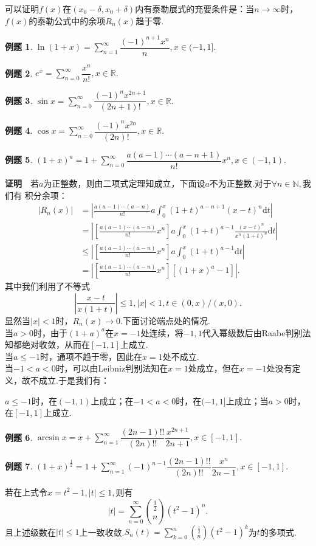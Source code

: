 \documentclass[UTF8]{article}
\newcommand{\R}{\mathbb{R}}
\newcommand{\zm}{\textbf{证明}$\quad$}
\newtheorem{exa}{\hspace{2em}例题}[section]
\begin{document}
  可以证明$f(x)$在$(x_0-\delta,x_0+\delta)$内有泰勒展式的充要条件是：当$n\to\infty$时，
  $f(x)$的泰勒公式中的余项$R_n(x)$趋于零.
  \begin{exa}
    $\ln(1+x)=\sum\limits_{n=1}^\infty \dfrac{(-1)^{n+1}x^n}{n},x\in(-1,1].$
  \end{exa}
  \begin{exa}
    $e^x=\sum\limits_{n=0}^\infty \dfrac{x^n}{n!},x\in \R.$
  \end{exa}
  \begin{exa}
    $\sin x=\sum\limits_{n=0}^\infty \dfrac{(-1)^nx^{2n+1}}{(2n+1)!},x\in \R.$
  \end{exa}
  \begin{exa}
    $\cos x=\sum\limits_{n=0}^\infty \dfrac{(-1)^nx^{2n}}{(2n)!},x\in \R.$
  \end{exa}
  \begin{exa}
    $(1+x)^a=1+\sum\limits_{n=0}^\infty \dfrac{a(a-1)\cdots(a-n+1)}{n!}x^n,x\in(-1,1).$
  \end{exa}
  \zm 若$a$为正整数，则由二项式定理知成立，下面设$a$不为正整数.对于$\forall n\in\mathbb{N},$我们有
  积分余项：
  \begin{align*}
    |R_n(x)|&=\left|\frac{a(a-1)\cdots(a-n)}{n!}a\int_0^x(1+t)^{a-n+1}(x-t)^n\mathrm{d}t\right|\\
    &=\left|\left[\frac{a(a-1)\cdots(a-n)}{n!}x^n\right]a\int_0^x(1+t)^{a-1}\frac{(x-t)^n}{x^n(1+t)^n}\mathrm{d}t\right|\\
    &\le\left|\left[\frac{a(a-1)\cdots(a-n)}{n!}x^n\right]a\int_0^x(1+t)^{a-1}\mathrm{d}t\right|\\
    &=\left|\left[\frac{a(a-1)\cdots(a-n)}{n!}x^n\right][(1+x)^a-1]\right|.
  \end{align*}
  其中我们利用了不等式
  $$\left|\frac{x-t}{x(1+t)}\right|\le 1,|x|<1,t\in(0,x)/(x,0).$$
  显然当$|x|<1$时，$R_n(x)\to0.$下面讨论端点处的情况.\\
  当$a>0$时，由于$(1+a)^a$在$x=-1$处连续，将$-1,1$代入幂级数后由Raabe判别法知都绝对收敛，从而在$[-1,1]$上成立.\\
  当$a\le-1$时，通项不趋于零，因此在$x=1$处不成立.\\
  当$-1<a<0$时，可以由Leibniz判别法知在$x=1$处成立，但在$x=-1$处没有定义，故不成立.于是我们有：

  $a\le -1$时，在$(-1,1)$上成立；在$-1<a<0$时，在$(-1,1]$上成立；当$a>0$时，在$[-1,1]$上成立.
  \begin{exa}
    $\arcsin x=x+\sum\limits_{n=1}^\infty\dfrac{(2n-1)!!}{(2n)!!}\dfrac{x^{2n+1}}{2n+1},x\in[-1,1].$
  \end{exa}
  \begin{exa}
    $(1+x)^\frac{1}{2}=1+\sum\limits_{n=1}^\infty (-1)^{n-1}\dfrac{(2n-1)!!}{(2n)!!}\dfrac{x^n}{2n-1},x\in[-1,1].$
  \end{exa}
  若在上式令$x=t^2-1,|t|\le 1,$则有
  $$|t|=\sum_{n=0}^\infty \binom{\frac{1}{2}}{n} (t^2-1)^n.$$
  且上述级数在$|t|\le 1$上一致收敛.$S_n(t)=\sum\limits_{k=0}^n\binom{\frac{1}{2}}{n} (t^2-1)^k$为$t$的多项式.
\end{document}
